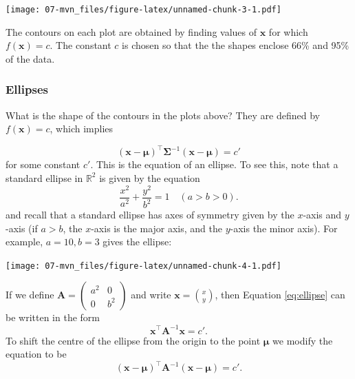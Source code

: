 \documentclass[]{book}
\theoremstyle{definition}
\theoremstyle{definition}
\theoremstyle{definition}
\theoremstyle{remark}
\begin{document}
\texttt{[image: 07-mvn\_files/figure-latex/unnamed-chunk-3-1.pdf]}

The contours on each plot are obtained by finding values of \(\boldsymbol x\) for which \(f(\boldsymbol x)=c\). The constant \(c\) is chosen so that the the shapes
enclose 66\% and 95\% of the data.

\hypertarget{ellipses}{%
\subsubsection*{Ellipses}\label{ellipses}}

What is the shape of the contours in the plots above? They are defined by \(f(\boldsymbol x)=c\), which implies

\begin{equation}
(\boldsymbol x- \boldsymbol \mu)^\top \boldsymbol \Sigma^{-1} (\boldsymbol x- \boldsymbol \mu)=c' \label{eq:mvnellipse}
\end{equation}
for some constant \(c'\).
This is the equation of an ellipse. To see this, note that a standard ellipse in \(\mathbb{R}^2\) is given by the equation
\begin{equation}
\frac{x^2}{a^2}+\frac{y^2}{b^2}=1 \quad (a>b>0). \label{eq:ellipse}
\end{equation}
and recall that a standard ellipse has axes of symmetry given by the \(x\)-axis and \(y\)-axis
(if \(a>b\), the \(x\)-axis is the major axis, and the \(y\)-axis the minor axis). For example, \(a=10, b=3\) gives the ellipse:

\texttt{[image: 07-mvn\_files/figure-latex/unnamed-chunk-4-1.pdf]}

If we define
\({\mathbf A}=\left( \begin{array}{cc} a^2&0\\ 0&b^2 \end{array} \right)\) and write \({\mathbf x}=\binom{x}{y}\),
then Equation \eqref{eq:ellipse} can be written in the form
\[ \boldsymbol x^\top {\mathbf A}^{-1}\boldsymbol x=c'. \]
To shift the centre of the ellipse from the origin to the point \(\boldsymbol \mu\) we modify the equation to be
\[ (\boldsymbol x-\boldsymbol \mu)^\top {\mathbf A}^{-1}(\boldsymbol x-\boldsymbol \mu) =c'.\]
\end{document}

